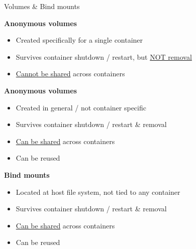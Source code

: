 \documentclass[10pt]{article}
\newcommand{\summary}[2]{\begin{summarybox}{#1}
  #2
  \vspace*{-1.3em}
\end{summarybox}}
\newcommand{\headline}[1]{\textbf{\color{teal}#1}}
\newcommand{\feature}[2]{
  \headline{#1}
  \vspace*{-.5em}
  \begin{itemize}
    \setlength\itemsep{-.1em}
    \small
    #2
  \end{itemize}
  \vspace*{.3em}
}
\begin{document}
\begin{multicols*}{2}
  \summary{Volumes \& Bind mounts}{
    \feature{Anonymous volumes}{
      \item Created specifically for a single container
      \item Survives container shutdown / restart, but \underline{NOT removal}
      \item \underline{Cannot be shared} across containers
    }
    \feature{Anonymous volumes}{
      \item Created in general / not container specific
      \item Survives container shutdown / restart \& removal
      \item \underline{Can be shared} across containers
      \item Can be reused
    }
    \feature{Bind mounts}{
      \item Located at host file system, not tied to any container
      \item Survives container shutdown / restart \& removal
      \item \underline{Can be shared} across containers
      \item Can be reused
    }
  }
\end{multicols*}
\end{document}
